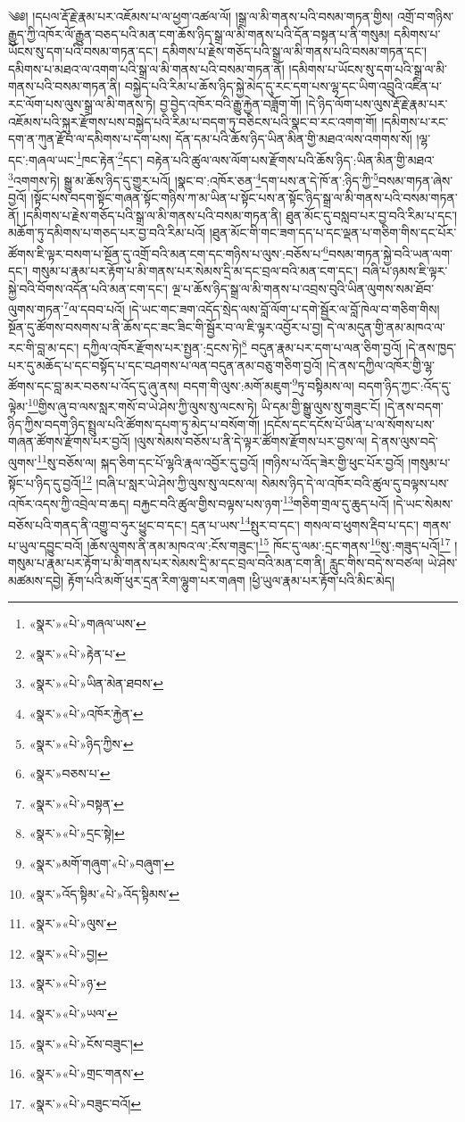 ༄༅། །དཔལ་རྡོ་རྗེ་རྣམ་པར་འཇོམས་པ་ལ་ཕྱག་འཚལ་ལོ། །སྒྲ་ལ་མི་གནས་པའི་བསམ་གཏན་གྱིས། འགྲོ་བ་གཉིས་རྒྱུད་ཀྱི་འཁོར་ལོ་རྒྱུན་བཅད་པའི་མན་ངག་ཆོས་ཉིད་སྒྲ་ལ་མི་གནས་པའི་དོན་བསྟན་པ་ནི་གསུམ། དམིགས་པ་ཡོངས་སུ་དག་པའི་བསམ་གཏན་དང་། དམིགས་པ་རྗེས་གཅོད་པའི་སྒྲ་ལ་མི་གནས་པའི་བསམ་གཏན་དང་། དམིགས་པ་མཐའ་ལ་འགག་པའི་སྒྲ་ལ་མི་གནས་པའི་བསམ་གཏན་ནོ། །དམིགས་པ་ཡོངས་སུ་དག་པའི་སྒྲ་ལ་མི་གནས་པའི་བསམ་གཏན་ནི། བསྐྱེད་པའི་རིམ་པ་ཆོས་ཉིད་སྐྱེ་མེད་དུ་རང་དག་པས་ལྷ་དང་ཡིག་འབྲུའི་འཛིན་པ་རང་ལོག་པས་ལུས་སྒྲ་ལ་མི་གནས་ཏེ། བྱ་བྱེད་འཁོར་བའི་རྒྱུ་རྐྱེན་བཟློག་གོ། །དེ་ཉིད་ལོག་པས་ལུས་རྡོ་རྗེ་རྣམ་པར་འཇོམས་པའི་སྐུར་རྫོགས་པས་བསྐྱེད་པའི་རིམ་པ་བདག་ཏུ་བཅིངས་པའི་སྣང་བ་རང་འགག་གོ། །དམིགས་པ་རང་དག་ན་ཀུན་རྫོབ་ལ་དམིགས་པ་དག་པས། དོན་དམ་པའི་ཆོས་ཉིད་ཡིན་མིན་གྱི་མཐའ་ལས་འགགས་སོ། །ལྷ་དང་:གཞལ་ཡང་\footnote{«སྣར་»«པེ་»གཞལ་ཡས་}ཁང་རྟེན་\footnote{«སྣར་»«པེ་»རྟེན་པ་}དང་། བརྟེན་པའི་ཚུལ་ལས་ལོག་པས་རྫོགས་པའི་ཆོས་ཉིད་:ཡིན་མིན་གྱི་མཐའ་\footnote{«སྣར་»«པེ་»ཡིན་མེན་ཐབས་}འགགས་ཏེ། སྒྱུ་མ་ཆོས་ཉིད་དུ་གྱུར་པའོ། །སྣང་བ་:འཁོར་ཅན་\footnote{«སྣར་»«པེ་»འཁོར་རྐྱེན་}དག་པས་ན་དེ་ཁོ་ན་:ཉིད་ཀྱི་\footnote{«སྣར་»«པེ་»ཉིད་ཀྱིས་}བསམ་གཏན་ཞེས་བྱའོ། །སྟོང་པས་བདག་སྟོང་གཞན་སྟོང་གཉིས་ཀ་མ་ཡིན་པ་སྟོང་པས་ན་སྟོང་ཉིད་སྒྲ་ལ་མི་གནས་པའི་བསམ་གཏན་ནོ། །དམིགས་པ་རྗེས་གཅོད་པའི་སྒྲ་ལ་མི་གནས་པའི་བསམ་གཏན་ནི། ཐུན་མོང་དུ་བསླབ་པར་བྱ་བའི་རིམ་པ་དང་། མཆོག་ཏུ་དམིགས་པ་གཅད་པར་བྱ་བའི་རིམ་པའོ། །ཐུན་མོང་གི་གང་ཟག་དད་པ་དང་ལྡན་པ་གཅིག་གིས་དང་པོར་ཚོགས་ཇི་ལྟར་བསག་པ་སྔོན་དུ་འགྲོ་བའི་མན་ངག་དང་གཉིས་པ་ལུས་:བཅོས་པ་\footnote{«སྣར་»བཅས་པ་}བསམ་གཏན་སྐྱེ་བའི་ཡན་ལག་དང་། གསུམ་པ་རྣམ་པར་རྟོག་པ་མི་གནས་པར་སེམས་དྲི་མ་དང་བྲལ་བའི་མན་ངག་དང་། བཞི་པ་ཉམས་ཇི་ལྟར་སྐྱེ་བའི་བོགས་འདོན་པའི་མན་ངག་དང་། ལྔ་པ་ཆོས་ཉིད་སྒྲ་ལ་མི་གནས་པ་འབྲས་བུའི་ཡིན་ལུགས་སམ་ཐོབ་ལུགས་གཏན་\footnote{«སྣར་»«པེ་»བསྟན་}ལ་དབབ་པའོ། །དེ་ཡང་གང་ཟག་འདོད་སྲེད་ལས་བློ་ལོག་པ་དགེ་སྦྱོར་ལ་བློ་ཁེལ་བ་གཅིག་གིས། སྔོན་དུ་ཚོགས་བསགས་པ་ནི་ཆོས་དང་ཟང་ཟིང་གི་སྦྱོར་བ་ལ་ཇི་ལྟར་འབྱོར་པ་བྱ། དེ་ལ་མདུན་གྱི་ནམ་མཁའ་ལ་རང་གི་བླ་མ་དང་། དཀྱིལ་འཁོར་རྫོགས་པར་སྤྱན་:དྲངས་ཏེ།\footnote{«སྣར་»«པེ་»དྲང་སྟེ།} བདུན་རྣམ་པར་དག་པ་ལན་ཅིག་བྱའོ། །དེ་ནས་ཁྱད་པར་དུ་མཆོད་པ་དང་བསྟོད་པ་དང་བཤགས་པ་ལན་བདུན་ནམ་བཅུ་གཅིག་བྱའོ། །དེ་ནས་དཀྱིལ་འཁོར་གྱི་ལྷ་ཚོགས་དང་བླ་མར་བཅས་པ་འོད་དུ་ཞུ་ནས། བདག་གི་ལུས་:མགོ་མཇུག་\footnote{«སྣར་»མགོ་གཞུག་«པེ་»བཞུག་}ཏུ་བསྟིམས་ལ། བདག་ཉིད་ཀྱང་:འོད་དུ་ལྟེམ་\footnote{«སྣར་»འོད་སྟིམ་«པེ་»འོད་སྟིམས་}གྱིས་ཞུ་བ་ལས་སླར་གསོ་བ་ཡེ་ཤེས་ཀྱི་ལུས་སུ་ལངས་ཏེ། ཡི་དམ་གྱི་སྒྱུ་ལུས་སུ་གཟུང་ངོ། །དེ་ནས་བདག་ཉིད་ཀྱིས་བདག་ཉིད་སྤྲུལ་པའི་ཚོགས་དཔག་ཏུ་མེད་པ་བསོག་གོ། །དངོས་དང་དངོས་པོ་ཡིན་པ་ལ་སོགས་པས་གཞན་ཚོགས་རྫོགས་པར་བྱའོ། །ལུས་སེམས་བཅོས་པ་ནི་དེ་ལྟར་ཚོགས་རྫོགས་པར་བྱས་ལ། དེ་ནས་ལུས་བདེ་ལུགས་\footnote{«སྣར་»«པེ་»ལུས་}སུ་བཅོས་ལ། སྐད་ཅིག་དང་པོ་ལྷའི་རྣལ་འབྱོར་དུ་བྱའོ། །གཉིས་པ་འོད་ཟེར་གྱི་ཕུང་པོར་བྱའོ། །གསུམ་པ་སྟོང་པ་ཉིད་དུ་བྱའོ།\footnote{«སྣར་»«པེ་»བྱ།} །བཞི་པ་སླར་ཡེ་ཤེས་ཀྱི་ལུས་སུ་ལངས་ལ། སེམས་ཉིད་དེ་ལ་འཁོར་བའི་ཚུལ་དུ་བལྟས་པས་འཁོར་འདས་ཀྱི་འབྲེལ་བ་ཆད། བརྐྱང་བའི་ཚུལ་གྱིས་བལྟས་པས་ཉག་\footnote{«སྣར་»«པེ་»ཉ་}གཅིག་གྲལ་དུ་ཆུད་པའོ། །དེ་ཡང་སེམས་བཅོས་པའི་གནད་ནི་འགྱུ་བ་ཧུར་ཕྱུང་བ་དང་། དྲན་པ་ཡས་\footnote{«སྣར་»«པེ་»ཡལ་}སྤུར་བ་དང་། གསལ་བ་ཕུགས་རྡིབ་པ་དང་། གནས་པ་ཡུལ་དབྱུང་བའོ། །ཆོས་ལུགས་ནི་ནམ་མཁའ་ལ་:ངོས་གཟུང་།\footnote{«སྣར་»«པེ་»ངོས་བཟུང་།} ཁོང་དུ་ལམ་:དྲང་གནས་\footnote{«སྣར་»«པེ་»གྲང་གནས་}སུ་:གཟུད་པའོ།\footnote{«སྣར་»«པེ་»བཟུང་བའོ།} །གསུམ་པ་རྣམ་པར་རྟོག་པ་མི་གནས་པར་སེམས་དྲི་མ་དང་བྲལ་བའི་མན་ངག་ནི། རླུང་གིས་བདེ་ས་བཙལ། ཡེ་ཤེས་མཚམས་དབྱེ། རྟོག་པའི་མགོ་ཕུར་དྲན་རིག་ལྷུག་པར་གཞག །ཕྱི་ཡུལ་རྣམ་པར་རྟོག་པའི་མིང་མེད། 